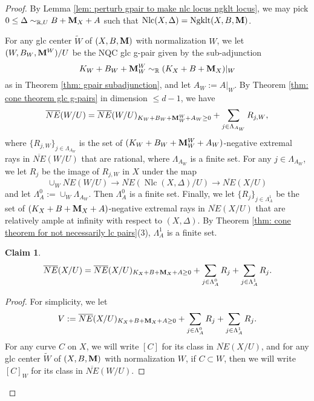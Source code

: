 \documentclass[11pt]{amsart}
\numberwithin{equation}{section}
\newcommand{\Mm}{{\bf{M}}}
\newcommand{\Rr}{\mathbb{R}}
\newcommand{\Ngklt}{\operatorname{Ngklt}}
\newcommand{\Nlc}{\operatorname{Nlc}}
\newtheorem{claim}[thm]{Claim}
\theoremstyle{definition}
\theoremstyle{definition}
\theoremstyle{definition}
\begin{document}
\begin{proof}
By Lemma \ref{lem: perturb gpair to make nlc locus ngklt locus}, we may pick $0\leq\Delta\sim_{\Rr,U}B+\Mm_X+A$ such that $\Nlc(X,\Delta)=\Ngklt(X,B,\Mm)$.

For any glc center $\tilde W$ of $(X,B,\Mm)$ with normalization $W$, we let $(W,B_{W},\Mm^{W})/U$ be the NQC glc g-pair given by the sub-adjunction
    $$K_{W}+B_{W}+\Mm^{W}_{W}\sim_{\Rr}(K_X+B+\Mm_X)|_{W}$$
    as in Theorem \ref{thm: gpair subadjunction}, and let $A_W:=A|_W$.  By Theorem \ref{thm: cone theorem glc g-pairs} in dimension $\leq d-1$, we have 
$$\overline{NE}(W/U)=\overline{NE}(W/U)_{K_W+B_W+\Mm^W_W+A_W\geq 0}+\sum_{j\in\Lambda_{A_W}}R_{j,W},$$
where $\{R_{j,W}\}_{j\in\Lambda_{A_W}}$ is the set of $(K_W+B_W+\Mm^W_W+A_W)$-negative extremal rays in $\overline{NE}(W/U)$ that are rational, where $\Lambda_{A_W}$ is a finite set. For any $j\in\Lambda_{A_W}$, we let $R_j$ be the image of $R_{j,W}$ in $X$ under the map
$$\cup_W\overline{NE}(W/U)\rightarrow\overline{NE}(\Nlc(X,\Delta)/U)\rightarrow\overline{NE}(X/U)$$
and let $\Lambda^0_A:=\cup_{W}\Lambda_{A_W}$. Then $\Lambda^0_A$ is a finite set. Finally, we let $\{R_j\}_{j\in\Lambda^1_A}$ be the set of $(K_X+B+\Mm_X+A)$-negative extremal rays in $\overline{NE}(X/U)$ that are relatively ample at infinity with respect to $(X,\Delta)$. By Theorem \ref{thm: cone theorem for not necessarily lc pairs}(3), $\Lambda_A^1$ is a finite set.
\begin{claim}\label{claim: gpair necone spanned by images first step}
$$\overline{NE}(X/U)=\overline{NE}(X/U)_{K_X+B+\Mm_X+A\geq 0}+\sum_{j\in\Lambda^0_A}R_j+\sum_{j\in\Lambda^1_A}R_j.$$
\end{claim}
\begin{proof}
For simplicity, we let $$V:=\overline{NE}(X/U)_{K_X+B+\Mm_X+A\geq 0}+\sum_{j\in\Lambda^0_A}R_j+\sum_{j\in\Lambda^1_A}R_j.$$
For any curve $C$ on $X$, we will write $[C]$ for its class in $\overline{NE}(X/U)$, and for any glc center $\tilde W$ of $(X,B,\Mm)$ with normalization $W$, if $C\subset W$, then we will write $[C]_W$ for its class in $\overline{NE}(W/U)$.



\end{proof}
\end{proof}
\end{document}
